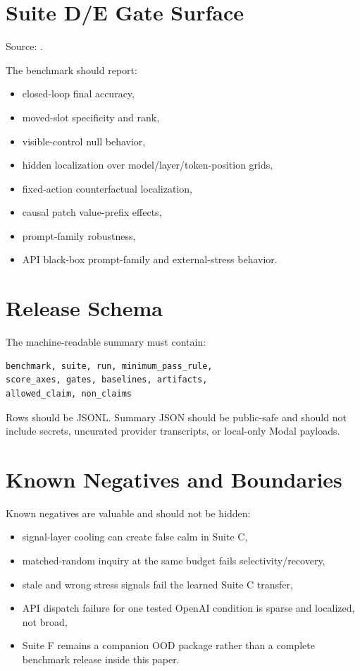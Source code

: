 \section{Suite D/E Gate Surface}

Source: .

The benchmark should report:
\begin{itemize}
  \item closed-loop final accuracy,
  \item moved-slot specificity and rank,
  \item visible-control null behavior,
  \item hidden localization over model/layer/token-position grids,
  \item fixed-action counterfactual localization,
  \item causal patch value-prefix effects,
  \item prompt-family robustness,
  \item API black-box prompt-family and external-stress behavior.
\end{itemize}

\section{Release Schema}

The machine-readable summary must contain:
\begin{verbatim}
benchmark, suite, run, minimum_pass_rule,
score_axes, gates, baselines, artifacts,
allowed_claim, non_claims
\end{verbatim}

Rows should be JSONL. Summary JSON should be public-safe and should not include
secrets, uncurated provider transcripts, or local-only Modal payloads.

\section{Known Negatives and Boundaries}

Known negatives are valuable and should not be hidden:
\begin{itemize}
  \item signal-layer cooling can create false calm in Suite C,
  \item matched-random inquiry at the same budget fails selectivity/recovery,
  \item stale and wrong stress signals fail the learned Suite C transfer,
  \item API dispatch failure for one tested OpenAI condition is sparse and
  localized, not broad,
  \item Suite F remains a companion OOD package rather than a complete benchmark
  release inside this paper.
\end{itemize}
